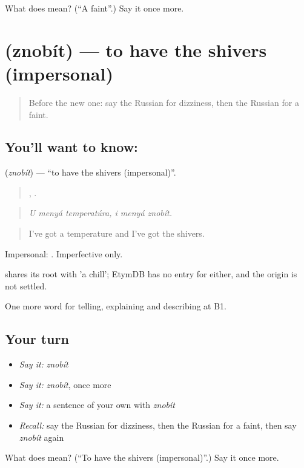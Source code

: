 \begin{tcolorbox}[breakable,colback=teal!4,colframe=teal!35!black,title={Before you move on}]
What does  mean? (\textquotedblleft{}A faint\textquotedblright{}.) Say it once more.
\end{tcolorbox}
\section[\texorpdfstring{\ru{знобить} (znobít)}{знобить (znobít)}]{ (znobít) — to have the shivers (impersonal)}

\label{lesson:RU-C485-znobit}



\begin{quote}
Before the new one: say the Russian for dizziness, then the Russian for a faint.
\end{quote}

\subsection*{You'll want to know: }
\textbf{} (\emph{znobít}) — \textquotedblleft{}to have the shivers (impersonal)\textquotedblright{}.

\begin{quote}
  ,   .
\end{quote}

\begin{quote}
\emph{U menyá temperatúra, i menyá znobít.}
\end{quote}

\begin{quote}
I've got a temperature and I've got the shivers.
\end{quote}

Impersonal: \emph{ }. Imperfective only.

\begin{cousinweb}
\emph{} shares its root with \emph{} 'a chill'; EtymDB has no entry for either, and the origin is not settled.
\end{cousinweb}

\begin{grammarlens}[title={What you've built}]
One more word for telling, explaining and describing at B1.
\end{grammarlens}

\subsection*{Your turn}
\begin{itemize}
\raggedright
  \item \emph{Say it:} \emph{znobít}
  \item \emph{Say it:} \emph{znobít}, once more
  \item \emph{Say it:} a sentence of your own with \emph{znobít}
  \item \emph{Recall:} say the Russian for dizziness, then the Russian for a faint, then say \emph{znobít} again
\end{itemize}

\begin{tcolorbox}[breakable,colback=teal!4,colframe=teal!35!black,title={Before you move on}]
What does  mean? (\textquotedblleft{}To have the shivers (impersonal)\textquotedblright{}.) Say it once more.
\end{tcolorbox}
